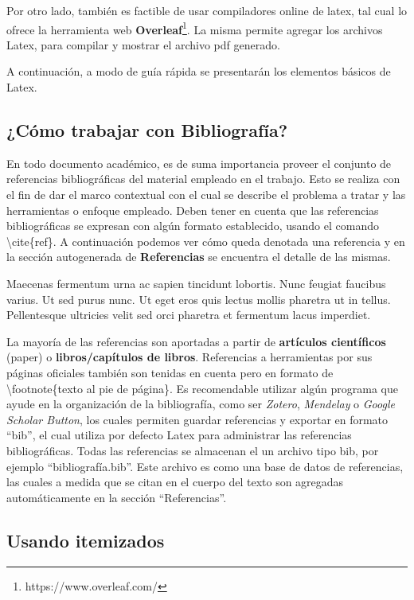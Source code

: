 \documentclass[1p,12pt]{elsarticle}
\begin{document}
Por otro lado, también es factible de usar compiladores online de latex, tal cual lo ofrece la herramienta web \textbf{Overleaf}\footnote{https://www.overleaf.com/}. La misma permite agregar los archivos Latex, para compilar y mostrar el archivo pdf generado.

A continuación, a modo de guía rápida se presentarán los elementos básicos de Latex.

\subsection{¿Cómo trabajar con Bibliografía?} %
\label{sub:biblio}

En todo documento académico, es de suma importancia proveer el conjunto de referencias bibliográficas del material empleado en el trabajo. Esto se realiza con el fin de dar el marco contextual con el cual se describe el problema a tratar y las herramientas o enfoque empleado. Deben tener en cuenta que las referencias bibliográficas se expresan con algún formato establecido, usando el comando \textbackslash cite\{ref\}. A continuación podemos ver cómo queda denotada una referencia y en la sección autogenerada de \textbf{Referencias} se encuentra el detalle de las mismas.

Maecenas \cite{Smith:2012qr} fermentum \cite{Smith:2013jd} urna ac sapien tincidunt lobortis. Nunc feugiat faucibus varius. Ut sed purus nunc. Ut eget eros quis lectus mollis pharetra ut in tellus. Pellentesque ultricies velit sed orci pharetra et fermentum lacus imperdiet.

La mayoría de las referencias son aportadas a partir de \textbf{artículos científicos} (paper) o \textbf{libros/capítulos de libros}. Referencias a herramientas por sus páginas oficiales también son tenidas en cuenta pero en formato de \textbackslash footnote\{texto al pie de página\}. Es recomendable utilizar algún programa que ayude en la organización de la bibliografía, como ser \textit{Zotero}, \textit{Mendelay} o \textit{Google Scholar Button}, los cuales permiten guardar referencias y exportar en formato ``bib'', el cual utiliza por defecto Latex para administrar las referencias bibliográficas. Todas las referencias se almacenan el un archivo tipo bib, por ejemplo ``bibliografía.bib''. Este archivo es como una base de datos de referencias, las cuales a medida que se citan en el cuerpo del texto son agregadas automáticamente en la sección ``Referencias''.

\subsection{Usando itemizados} %
\label{sub:itemizados}
\end{document}
